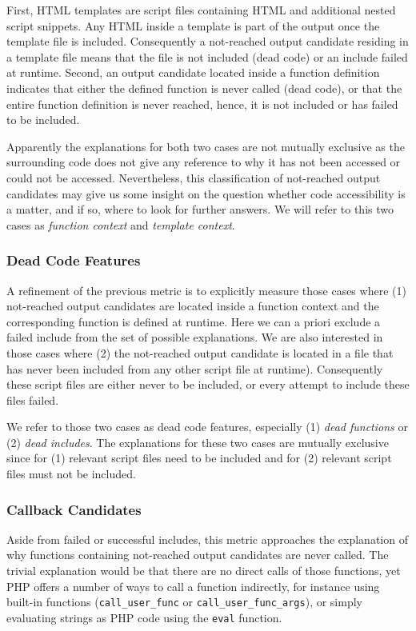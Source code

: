 \documentclass{sig-alternate-05-2015}
\begin{document}
First, HTML templates are script files containing HTML and additional nested script snippets. Any HTML inside a template is part of the output once the template file is included. Consequently a not-reached output candidate residing in a template file means that the file is not included (dead code) or an include failed at runtime. Second, an output candidate located inside a function definition indicates that either the defined function is never called (dead code), or that the entire function definition is never reached, hence, it is not included or has failed to be included.

Apparently the explanations for both two cases are not mutually exclusive as the surrounding code does not give any reference to why it has not been accessed or could not be accessed. Nevertheless, this classification of not-reached output candidates may give us some insight on the question whether code accessibility is a matter, and if so, where to look for further answers. We will refer to this two cases as \emph{function context} and \emph{template context}.

\subsubsection{Dead Code Features} \label{dead_feature_section}
A refinement of the previous metric is to explicitly measure those cases where (1) not-reached output candidates are located inside a function context and the corresponding function is defined at runtime. Here we can a priori exclude a failed include from the set of possible explanations. We are also interested in those cases where (2) the not-reached output candidate is located in a file that has never been included from any other script file at runtime). Consequently these script files are either never to be included, or every attempt to include these files failed.

We refer to those two cases as dead code features, especially (1) \emph{dead functions} or (2) \emph{dead includes}. The explanations for these two cases are mutually exclusive since for (1) relevant script files need to be included and for (2) relevant script files must not be included.

\subsubsection{Callback Candidates} \label{callback_candidate_section}
Aside from failed or successful includes, this metric approaches the explanation of why functions containing not-reached output candidates are never called. The trivial explanation would be that there are no direct calls of those functions, yet PHP offers a number of ways to call a function indirectly, for instance using built-in functions (\texttt{call\_user\_func} or \texttt{call\_user\_func\_args}), or simply evaluating strings as PHP code using the \texttt{eval} function. 
\end{document}
